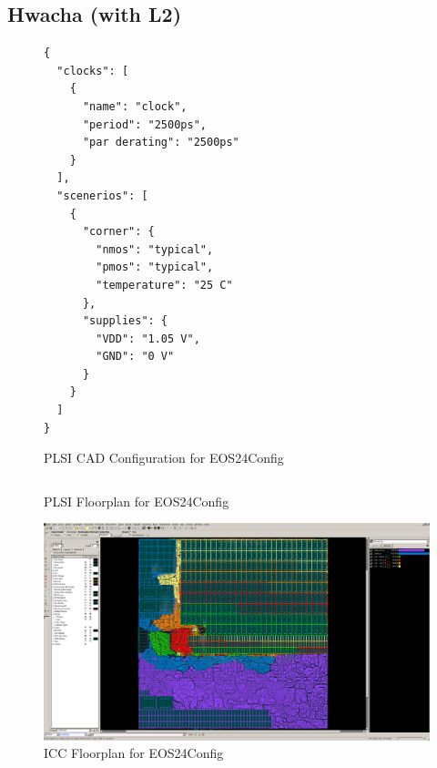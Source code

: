 \documentclass{article}
\begin{document}
\subsection{Hwacha (with L2)}

\begin{figure}
  \begin{verbatim}
{
  "clocks": [
    {
      "name": "clock",
      "period": "2500ps",
      "par derating": "2500ps"
    }
  ],
  "scenerios": [
    {
      "corner": {
        "nmos": "typical",
        "pmos": "typical",
        "temperature": "25 C"
      },
      "supplies": {
        "VDD": "1.05 V",
        "GND": "0 V"
      }
    }
  ]
}
\end{verbatim}
  \caption{PLSI CAD Configuration for EOS24Config}
  \label{res:hwacha-config}
\end{figure}

\begin{figure}
\begin{verbatim}
\end{verbatim}
  \caption{PLSI Floorplan for EOS24Config}
  \label{res:rocket-fppy}
\end{figure}

\begin{figure}
  \begin{center}
    \includegraphics[width=0.95\linewidth]{figures/icc-hwacha.png}
  \end{center}
  \caption{ICC Floorplan for EOS24Config}
  \label{res:hwacha-icc}
\end{figure}
\end{document}
